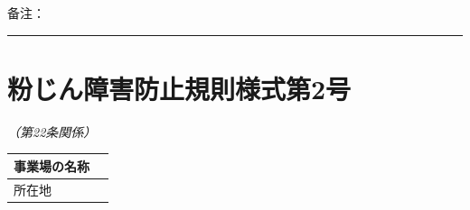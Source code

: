 \documentclass[UTF8,10pt,a4paper,fontset=fandol]{ctexart}
\begin{document}
\vspace{0.5em}

\noindent
备注：\rule{0.8\textwidth}{0.4pt}

\vfill

\noindent

\newpage

\section*{粉じん障害防止規則様式第2号}
\textit{（第22条関係）}

\begin{tabularx}{\textwidth}{|p{}|X|p{}|}
\hline
事業場の名称 & \multicolumn{2}{l|}{\rule{0pt}{2.2ex}}\\
\hline
所在地 & \multicolumn{2}{l|}{\rule{0pt}{2.2ex}}\\
\hline
\end{tabularx}

\vspace{1em}
\end{document}

